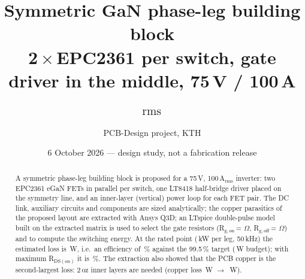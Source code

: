 ﻿\documentclass[10pt,a4paper]{article}
\title{Symmetric GaN phase-leg building block\\[2pt]\large 2\,$\times$\,EPC2361 per switch, gate driver in the middle, 75\,V / 100\,A$_\mathrm{rms}$}
\author{PCB-Design project, KTH}
\date{6 October 2026 --- design study, not a fabrication release}
\begin{document}
\maketitle

\begin{abstract}
A symmetric phase-leg building block is proposed for a 75\,V, 100\,A$_\mathrm{rms}$ inverter: two EPC2361 eGaN FETs in parallel per switch, one LT8418 half-bridge driver placed on the symmetry line, and an inner-layer (vertical) power loop for each FET pair.
The DC link, auxiliary circuits and components are sized analytically; the copper parasitics of the proposed layout are extracted with Ansys Q3D; an LTspice double-pulse model built on the extracted matrix is used to select the gate resistors (R$_\mathrm{g,on}$\,=\,\RgOn\,$\Omega$, R$_\mathrm{g,off}$\,=\,\RgOff\,$\Omega$) and to compute the switching energy.
At the rated point (\Prated\,kW per leg, 50\,kHz) the estimated loss is \Ptot\,W, i.e.\ an efficiency of \Eta\,\% against the 99.5\,\% target (\Pbudget\,W budget); with maximum R$_\mathrm{DS(on)}$ it is \EtaWorst\,\%. The extraction also showed that the PCB copper is the second-largest loss: 2\,oz inner layers are needed (copper loss \PcuOneOz\,W $\to$ \Pcu\,W).
\end{abstract}
\end{document}

